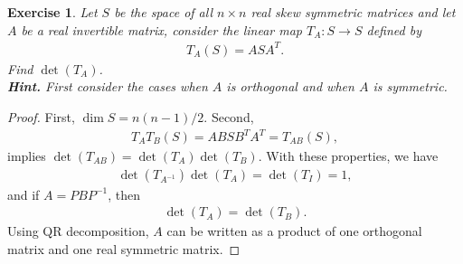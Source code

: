 \documentclass[10pt]{book}
\newtheorem{exercise}{Exercise}[section]
\theoremstyle{definition}
\numberwithin{equation}{chapter}
\begin{document}
\medskip

\begin{exercise}{\rm *}
Let $S$ be the space of all $n \times n$ real skew symmetric matrices and let $A$ be a real invertible matrix, consider the linear map $T_A: S \to S$ defined by 
\begin{align*}
    T_A(S) = ASA^T.
\end{align*}
Find $\det \left(T_A\right)$. \\
{\bf Hint.} First consider the cases when $A$ is orthogonal and when $A$ is symmetric.
\end{exercise}
\begin{proof}
First, $\dim S = n(n-1)/2$. Second, 
\begin{align*}
    T_A T_B (S) = A B S B^T A^T = T_{AB}(S),
\end{align*}
implies $\det \left(T_{AB}\right) = \det \left(T_A\right) \det \left(T_B\right)$. With these properties, we have
\begin{align*}
    \det \left(T_{A^{-1}}\right) \det \left(T_{A}\right) = \det \left(T_{I}\right) = 1,
\end{align*}
and if $A = P B P^{-1}$, then 
\begin{align*}
    \det \left(T_{A}\right) = \det \left(T_{B}\right).
\end{align*}
Using QR decomposition, $A$ can be written as a product of one orthogonal matrix and one real symmetric matrix.
\end{proof}

\medskip
\end{document}
